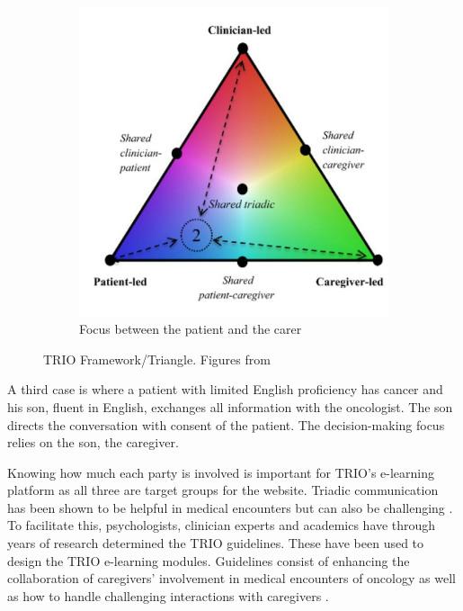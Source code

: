 \documentclass{sigchi}
\begin{document}
\begin{figure} [H]
\begin{subfigure}{.45\columnwidth}
  \includegraphics[width=1\columnwidth]{figures/Triangle2Screenshotjpg.jpg}
  \caption{Focus between the patient and the carer}
  \label{b:PatientCarer}
\end{subfigure}
\caption{TRIO Framework/Triangle. Figures from}
\label{fig:TRIO Framework/Triangle}
\end{figure}


A third case is where a patient with limited English proficiency has cancer and his son, fluent in English, exchanges all information with the oncologist. The son directs the conversation with consent of the patient. The decision-making focus relies on the son, the caregiver.

Knowing how much each party is involved is important for TRIO’s e-learning platform as all three are target groups for the website. Triadic communication has been shown to be helpful in medical encounters but can also be challenging \cite{Laidsaar-Powell2013}. To facilitate this, psychologists, clinician experts and academics have through years of research determined the TRIO guidelines. These have been used to design the TRIO e-learning modules. Guidelines consist of enhancing the collaboration of caregivers' involvement in medical encounters of oncology as well as how to handle challenging interactions with caregivers \cite{Laidsaar-Powell2018a, Laidsaar-Powell2018}.
\end{document}
